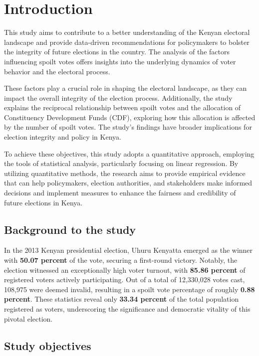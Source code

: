 \documentclass[fleqn,a4paper,12pt]{article}
\begin{document}
\section{Introduction}

This study aims to contribute to a better understanding of the Kenyan electoral landscape and provide data-driven recommendations for policymakers to bolster the integrity of future elections in the country. The analysis of the factors influencing spoilt votes offers insights into the underlying dynamics of voter behavior and the electoral process. 

These factors play a crucial role in shaping the electoral landscape, as they can impact the overall integrity of the election process. Additionally, the study explains the reciprocal relationship between spoilt votes and the allocation of Constituency Development Funds (CDF), exploring how this allocation is affected by the number of spoilt votes. The study's findings have broader implications for election integrity and policy in Kenya.

To achieve these objectives, this study adopts a quantitative approach, employing the tools of statistical analysis, particularly focusing on linear regression. By utilizing quantitative methods, the research aims to provide empirical evidence that can help policymakers, election authorities, and stakeholders make informed decisions and implement measures to enhance the fairness and credibility of future elections in Kenya.

\subsection{Background to the study}


In the 2013 Kenyan presidential election, Uhuru Kenyatta emerged as the winner with \textbf{50.07 percent} of the vote, securing a first-round victory. Notably, the election witnessed an exceptionally high voter turnout, with \textbf{85.86 percent} of registered voters actively participating. Out of a total of 12,330,028 votes cast, 108,975 were deemed invalid, resulting in a spoilt vote percentage of roughly \textbf{0.88 percent}. These statistics reveal only \textbf{33.34 percent} of the total population registered as voters, underscoring the significance and democratic vitality of this pivotal election.


\subsection{Study objectives}
\end{document}
